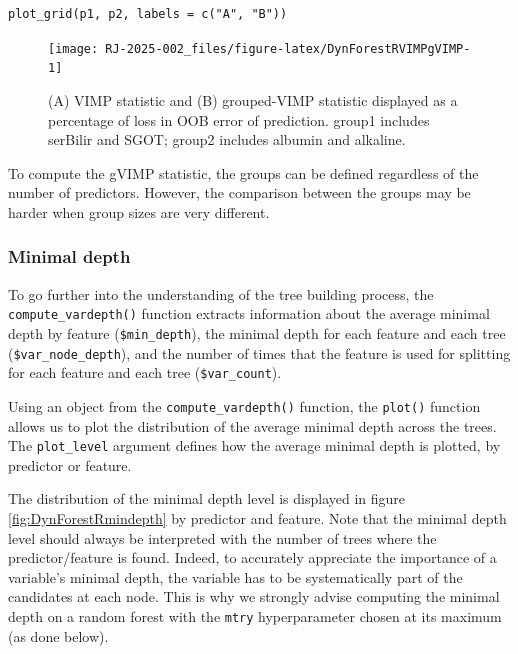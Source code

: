 \begin{verbatim}
plot_grid(p1, p2, labels = c("A", "B"))
\end{verbatim}

\begin{figure}

{\centering \texttt{[image: RJ-2025-002\_files/figure-latex/DynForestRVIMPgVIMP-1]} 

}

\caption{(A) VIMP statistic and (B) grouped-VIMP statistic displayed as a percentage of loss in OOB error of prediction. group1 includes serBilir and SGOT; group2 includes albumin and alkaline.}\label{fig:DynForestRVIMPgVIMP}
\end{figure}

To compute the gVIMP statistic, the groups can be defined regardless of the number of predictors. However, the comparison between the groups may be harder when group sizes are very different.

\subsubsection{Minimal depth}\label{minimal-depth-1}

To go further into the understanding of the tree building process, the \texttt{compute\_vardepth()} function extracts information about the average minimal depth by feature (\texttt{\$min\_depth}), the minimal depth for each feature and each tree (\texttt{\$var\_node\_depth}), and the number of times that the feature is used for splitting for each feature and each tree (\texttt{\$var\_count}).

Using an object from the \texttt{compute\_vardepth()} function, the \texttt{plot()} function allows us to plot the distribution of the average minimal depth across the trees. The \texttt{plot\_level} argument defines how the average minimal depth is plotted, by predictor or feature.

The distribution of the minimal depth level is displayed in figure \ref{fig:DynForestRmindepth} by predictor and feature. Note that the minimal depth level should always be interpreted with the number of trees where the predictor/feature is found. Indeed, to accurately appreciate the importance of a variable's minimal depth, the variable has to be systematically part of the candidates at each node. This is why we strongly advise computing the minimal depth on a random forest with the \texttt{mtry} hyperparameter chosen at its maximum (as done below).

